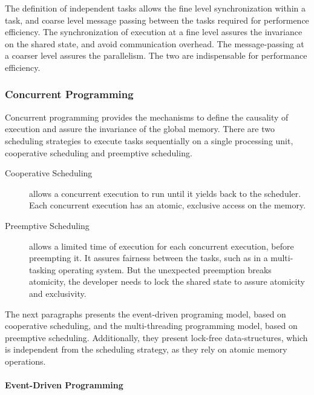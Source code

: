 The definition of independent tasks allows the fine level synchronization within a task, and coarse level message passing between the tasks required for performence efficiency.
The synchronization of execution at a fine level assures the invariance on the shared state, and avoid communication overhead.
The message-passing at a coarser level assures the parallelism.
The two are indispensable for performance efficiency.

\subsubsection{Concurrent Programming} \label{chapter3:software-maintainability:concurrency:concurrent-programming}


Concurrent programming provides the mechanisms to define the causality of execution and assure the invariance of the global memory.
There are two scheduling strategies to execute tasks sequentially on a single processing unit, cooperative scheduling and preemptive scheduling.

\begin{description}
\item[Cooperative Scheduling] allows a concurrent execution to run until it yields back to the scheduler.
Each concurrent execution has an atomic, exclusive access on the memory.
\item[Preemptive Scheduling] allows a limited time of execution for each concurrent execution, before preempting it.
It assures fairness between the tasks, such as in a multi-tasking operating system.
But the unexpected preemption breaks atomicity, the developer needs to lock the shared state to assure atomicity and exclusivity.
\end{description}

The next paragraphs presents the event-driven programing model, based on cooperative scheduling, and the multi-threading programming model, based on preemptive scheduling.
Additionally, they present lock-free data-structures, which is independent from the scheduling strategy, as they rely on atomic memory operations.

\paragraph{Event-Driven Programming}

